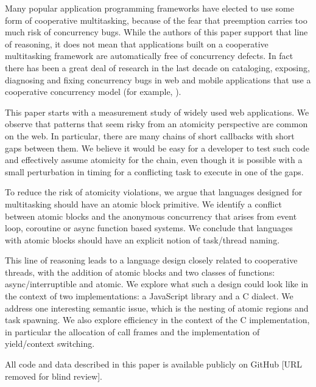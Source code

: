 \documentclass[sigplan,10pt,review,anonymous]{acmart}\settopmatter{printfolios=true,printccs=false,printacmref=false}
\begin{document}
Many popular application programming frameworks have elected to use some form of cooperative multitasking, because of the fear that preemption carries too much risk of concurrency bugs.
While the authors of this paper support that line of reasoning, it does not mean that applications built on a cooperative multitasking framework are automatically free of concurrency defects.
In fact there has been a great deal of research in the last decade on cataloging, exposing, diagnosing and fixing concurrency bugs in web and mobile applications that use a cooperative concurrency model (for example, \cite{Hsiao2014, Petrov2012, Mutlu2015}).

This paper starts with a measurement study of widely used web applications\footnotemark{}.
We observe that patterns that seem risky from an atomicity perspective are common on the web.
In particular, there are many chains of short callbacks with short gaps between them.
We believe it would be easy for a developer to test such code and effectively assume atomicity for the chain, even though it is possible with a small perturbation in timing for a conflicting task to execute in one of the gaps.


To reduce the risk of atomicity violations, we argue that languages designed for multitasking should have an atomic block primitive.
We identify a conflict between atomic blocks and the anonymous concurrency that arises from event loop, coroutine or async function based systems.
We conclude that languages with atomic blocks should have an explicit notion of task/thread naming.

This line of reasoning leads to a language design closely related to cooperative threads, with the addition of atomic blocks and two classes of functions: async/interruptible and atomic.
We explore what such a design could look like in the context of two implementations: a JavaScript library and a C dialect.
We address one interesting semantic issue, which is the nesting of atomic regions and task spawning.
We also explore efficiency in the context of the C implementation, in particular the allocation of call frames and the implementation of yield/context switching.

All code and data described in this paper is available publicly on GitHub [URL removed for blind review].
\end{document}
